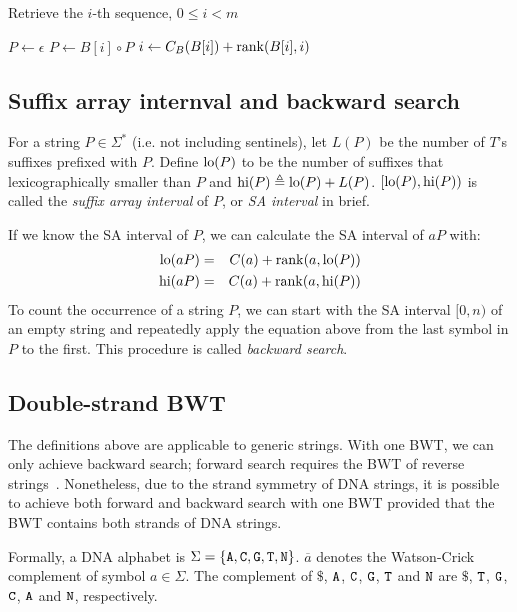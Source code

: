 \documentclass[webpdf,contemporary,large,namedate]{oup-authoring-template}%
\begin{document}
\begin{algorithm}[!htb]
	\caption{Retrieve the $i$-th sequence, $0\le i<m$}\label{algo:get}
	\begin{algorithmic}[1]
			\State $P\gets\epsilon$
			\State $P\gets B[i]\circ P$
			\State $i\gets C_B(B[i])+{\rm rank}(B[i],i)$
			\EndWhile
			\State {}
		\EndProcedure
	\end{algorithmic}
\end{algorithm}

\subsection{Suffix array internval and backward search}

For a string $P\in\Sigma^*$ (i.e. not including sentinels), let $L(P)$ be the number of $T$'s suffixes prefixed with $P$.
Define ${\rm lo}(P)$ to be the number of suffixes that lexicographically smaller than $P$
and ${\rm hi}(P)\triangleq {\rm lo}(P)+L(P)$.
$[{\rm lo}(P),{\rm hi}(P))$ is called the \emph{suffix array interval} of $P$, or \emph{SA interval} in brief.

If we know the SA interval of $P$, we can calculate the SA interval of $aP$ with:
\begin{eqnarray*}
{\rm lo}(aP)&=&C(a)+{\rm rank}(a,{\rm lo}(P))\\
{\rm hi}(aP)&=&C(a)+{\rm rank}(a,{\rm hi}(P))
\end{eqnarray*}
To count the occurrence of a string $P$,
we can start with the SA interval $[0,n)$ of an empty string and repeatedly apply the equation above from the last symbol in $P$ to the first.
This procedure is called \emph{backward search}.

\subsection{Double-strand BWT}

The definitions above are applicable to generic strings.
With one BWT, we can only achieve backward search;
forward search requires the BWT of reverse strings~\citep{DBLP:conf/bibm/LamLTWWY09}.
Nonetheless, due to the strand symmetry of DNA strings,
it is possible to achieve both forward and backward search with one BWT provided that the BWT contains both strands of DNA strings.

Formally, a DNA alphabet is $\Sigma=\{{\tt A},{\tt C},{\tt G},{\tt T},{\tt N}\}$.
$\overline{a}$ denotes the Watson-Crick complement of symbol $a\in\Sigma$.
The complement of $\$$, ${\tt A}$, ${\tt C}$, ${\tt G}$, ${\tt T}$ and ${\tt N}$
are $\$$, ${\tt T}$, ${\tt G}$, ${\tt C}$, ${\tt A}$ and ${\tt N}$, respectively.
\end{document}
